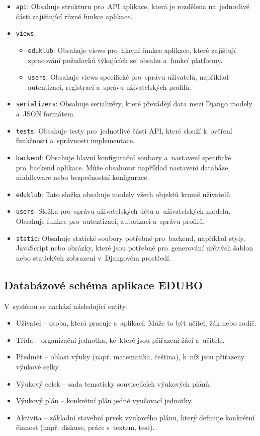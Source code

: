 \documentclass[male,czech,api_bc]{kitheses}
\begin{document}
\begin{itemize}
	\item \texttt{api}: Obsahuje strukturu pro~API aplikace, která je rozdělena na~jednotlivé části zajišťující různé funkce aplikace.
	\item \texttt{views}:
	\begin{itemize}
		\item \texttt{eduklub}: Obsahuje views pro~hlavní funkce aplikace, které zajišťují zpracování požadavků týkajících se~obsahu a~funkcí platformy.
		\item \texttt{users}: Obsahuje views specifické pro~správu uživatelů, například autentizaci, registraci a~správu uživatelských profilů.
	\end{itemize}
	\item \texttt{serializers}: Obsahuje serializéry, které převádějí data mezi Django modely a~JSON formátem.
	\item \texttt{tests}: Obsahuje testy pro~jednotlivé části API, které slouží k~ověření funkčnosti a~správnosti implementace.
	\item \texttt{backend}: Obsahuje hlavní konfigurační soubory a~nastavení specifické pro~backend aplikace. Může obsahovat například nastavení databáze, middleware nebo bezpečnostní konfigurace.
	\item \texttt{eduklub}: Tato složka obsahuje modely všech objektů kromě uživatelů.
	\item \texttt{users}: Složka pro~správu uživatelských účtů a~uživatelských modelů. Obsahuje funkce pro~autentizaci, autorizaci a~správu profilů.
	\item \texttt{static}: Obsahuje statické soubory potřebné pro~backend, například styly, JavaScript nebo obrázky, které jsou potřebné pro~generování určitých šablon nebo statických zobrazení v~Djangovém prostředí.
\end{itemize}

\subsection{Databázové schéma aplikace EDUBO}

V~systému se nachází následující entity:
\begin{itemize}
	\item Uživatel – osoba, která pracuje s~aplikací. Může to být učitel, žák nebo rodič.
	\item Třída – organizační jednotka, ke~které jsou přiřazeni žáci a~učitelé.
	\item Předmět – oblast výuky (např. matematika, čeština), k~níž jsou přiřazeny výukové celky.
	\item Výukový celek – sada tematicky souvisejících výukových plánů.
	\item Výukový plán – konkrétní plán jedné vyučovací jednotky.
	\item Aktivita – základní stavební prvek výukového plánu, který definuje konkrétní činnost (např. diskuse, práce s~textem, test).
\end{itemize}
\end{document}
